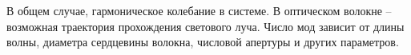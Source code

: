 В общем случае, гармоническое колебание в системе. В оптическом
волокне -- возможная траектория прохождения светового луча.
Число мод зависит от длины волны, диаметра сердцевины 
волокна, числовой апертуры и других параметров.